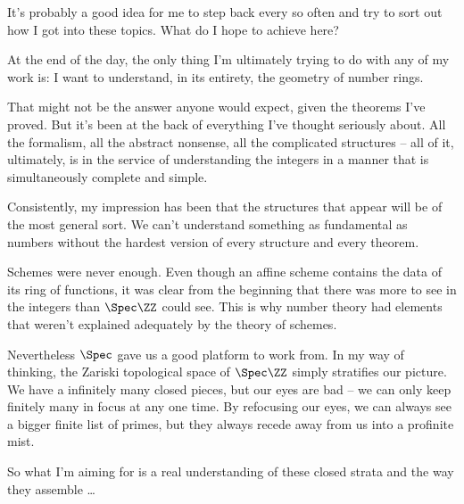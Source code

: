 
It's probably a good idea for me to step back every so often and
try to sort out how I got into these topics.
What do I hope to achieve here?

At the end of the day, the only thing I'm ultimately trying to do with any of my work is:
I want to understand, in its entirety, the geometry of number rings.

That might not be the answer anyone would expect,
given the theorems I've proved.
But it's been at the back of everything I've thought seriously about.
All the formalism, all the abstract nonsense, all the complicated structures --
all of it, ultimately, is in the service of understanding the integers
in a manner that is simultaneously complete and simple.

Consistently, my impression has been that the structures that appear will be of the most general sort.
We can't understand something as fundamental as numbers without the hardest version of every structure and every theorem.

Schemes were never enough.
Even though an affine scheme contains the data of its ring of functions,
it was clear from the beginning that there was more to see in the integers than $\Spec\ZZ$ could see.
This is why number theory had elements that weren't
explained adequately by the theory of schemes.

Nevertheless $\Spec$ gave us a good platform to work from.
In my way of thinking, the Zariski topological space of $\Spec \ZZ$ simply stratifies our picture.
We have a infinitely many closed pieces, but our eyes are bad --
we can only keep finitely many in focus at any one time.
By refocusing our eyes, we can always see a bigger finite list of primes, but they always recede away from us into a profinite mist.

So what I'm aiming for is a real understanding of these closed strata
and the way they assemble \ldots



